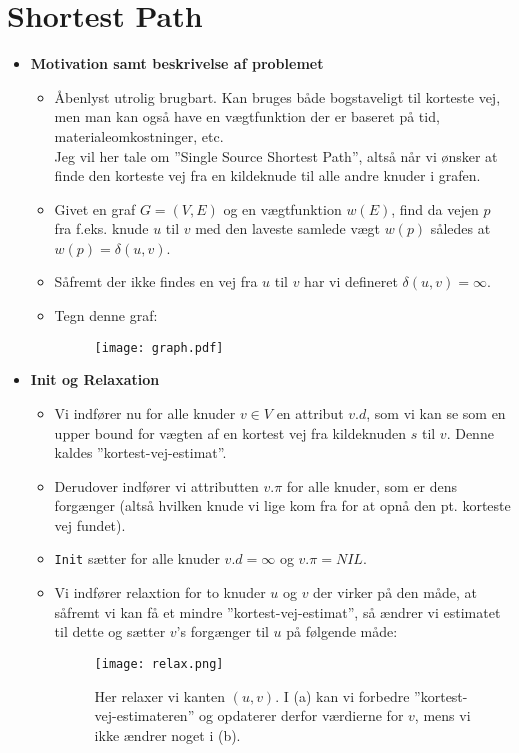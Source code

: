 \section{Shortest Path}



\begin{itemize}
\item \textbf{Motivation samt beskrivelse af problemet}
\begin{itemize}
	\item Åbenlyst utrolig brugbart. Kan bruges både bogstaveligt til korteste vej, men man kan også have en vægtfunktion der er baseret på tid, materialeomkostninger, etc.\\
	Jeg vil her tale om ''Single Source Shortest Path'', altså når vi ønsker at finde den korteste vej fra en kildeknude til alle andre knuder i grafen.
	\item Givet en graf $G = (V, E)$ og en vægtfunktion $w(E)$, find da vejen $p$ fra f.eks. knude $u$ til $v$ med den laveste samlede vægt $w(p)$ således at $w(p) = \delta(u, v)$.
	\item Såfremt der ikke findes en vej fra $u$ til $v$ har vi defineret $\delta(u, v) = \infty$.
	\item Tegn denne graf:
	\begin{figure}[H]
		\begin{center}
			\texttt{[image: graph.pdf]}
		\end{center}
		\label{fig:graph}
	\end{figure}
\end{itemize}



\item \textbf{Init og Relaxation}
\begin{itemize}
	\item Vi indfører nu for alle knuder $v \in V$ en attribut $v.d$, som vi kan se som en upper bound for vægten af en kortest vej fra kildeknuden $s$ til $v$. Denne kaldes ''kortest-vej-estimat''.
	\item Derudover indfører vi attributten $v.\pi$ for alle knuder, som er dens forgænger (altså hvilken knude vi lige kom fra for at opnå den pt. korteste vej fundet).
	\item \texttt{Init} sætter for alle knuder $v.d = \infty$ og $v.\pi = NIL$.
	\item Vi indfører relaxtion for to knuder $u$ og $v$ der virker på den måde, at såfremt vi kan få et mindre ''kortest-vej-estimat'', så ændrer vi estimatet til dette og sætter $v$'s forgænger til $u$ på følgende måde:
	\begin{figure}[H]
		\begin{center}
			\texttt{[image: relax.png]}
		\end{center}
		\caption{Her relaxer vi kanten $(u, v)$. I (a) kan vi forbedre ''kortest-vej-estimateren'' og opdaterer derfor værdierne for $v$, mens vi ikke ændrer noget i (b).}
		\label{fig:relax}
	\end{figure}
\end{itemize}


\end{itemize}
